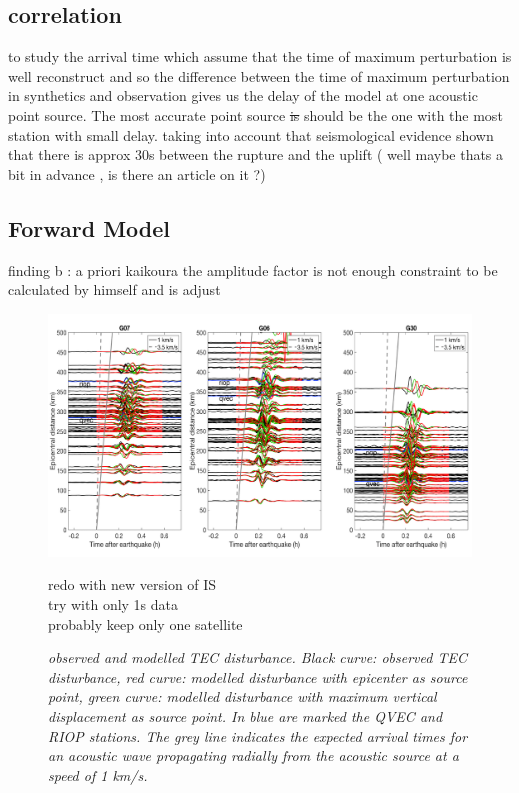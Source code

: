 \documentclass{gji}
\begin{document}
    \subsection{correlation}
to study the arrival time which assume that the time of maximum perturbation is well reconstruct and so the difference between the time of maximum perturbation in synthetics and observation gives us the delay of the model at one acoustic point source. The most accurate point source \sout{is} should be the one with the most station with small delay.
taking into account that seismological evidence shown that there is approx 30s between the rupture and the uplift ( well maybe thats a bit in advance , is there an article on it ?) 

    
   
\subsection{Forward Model}

finding b : a priori kaikoura  
the amplitude factor is not enough constraint to be calculated by himself and is adjust \begin{figure}

\includegraphics[width=0.9\linewidth]{images/Hodo_all_cropped.pdf}

redo with new version of IS \\
try with only 1s data\\
probably keep only one satellite
\caption{ \textit{\emph{observed and modelled TEC disturbance}.  Black curve: observed TEC disturbance, red curve: modelled disturbance with epicenter as source point, green curve: modelled disturbance with maximum vertical displacement as source point. In blue are marked the QVEC and RIOP stations. The grey line indicates the expected arrival times for an acoustic wave propagating radially from the acoustic source at a speed of 1 km/s.}}

\label{hodoseriesall}
\end{figure}
\end{document}
